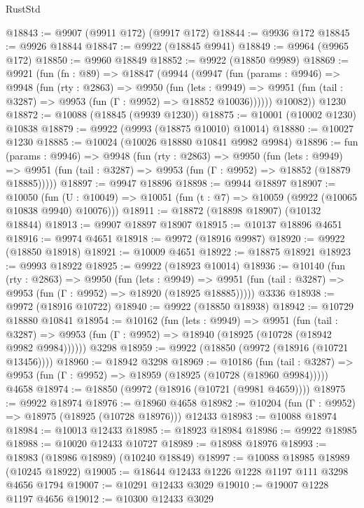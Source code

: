 \begin{lexlean}{RustStd}
\begin{coremodule}
@18843 := @9907 (@9911 @172) (@9917 @172)
@18844 := @9936 @172
@18845 := @9926 @18844
@18847 := @9922 (@18845 @9941)
@18849 := @9964 (@9965 @172)
@18850 := @9960 @18849
@18852 := @9922 (@18850 @9989)
@18869 := @9921
    (fun (fn : @89) =>
    @18847
      (@9944
        (@9947
          (fun (params : @9946) =>
          @9948
            (fun (rty : @2863) =>
            @9950
              (fun (lets : @9949) =>
              @9951 (fun (tail : @3287) => @9953 (fun (Γ : @9952) => @18852 @10036))))))
        @10082))
    @1230
@18872 := @10088 (@18845 (@9939 @1230))
@18875 := @10001 (@10002 @1230) @10838
@18879 := @9922 (@9993 (@18875 @10010) @10014)
@18880 := @10027 @1230
@18885 := @10024 (@10026 @18880 @10841 @9982 @9984)
@18896 := fun (params : @9946) =>
  @9948
    (fun (rty : @2863) =>
    @9950
      (fun (lets : @9949) =>
      @9951 (fun (tail : @3287) => @9953 (fun (Γ : @9952) => @18852 (@18879 @18885)))))
@18897 := @9947 @18896
@18898 := @9944 @18897
@18907 := @10050
    (fun (U : @10049) => @10051 (fun (t : @7) => @10059 (@9922 (@10065 @10838 @9940) @10076)))
@18911 := @18872 (@18898 @18907) (@10132 @18844)
@18913 := @9907 @18897 @18907
@18915 := @10137 @18896 @4651
@18916 := @9974 @4651
@18918 := @9972 (@18916 @9987)
@18920 := @9922 (@18850 @18918)
@18921 := @10009 @4651
@18922 := @18875 @18921
@18923 := @9993 @18922
@18925 := @9922 (@18923 @10014)
@18936 := @10140
    (fun (rty : @2863) =>
    @9950
      (fun (lets : @9949) =>
      @9951 (fun (tail : @3287) => @9953 (fun (Γ : @9952) => @18920 (@18925 @18885)))))
    @3336
@18938 := @9972 (@18916 @10722)
@18940 := @9922 (@18850 @18938)
@18942 := @10729 @18880 @10841
@18954 := @10162
    (fun (lets : @9949) =>
    @9951
      (fun (tail : @3287) =>
      @9953 (fun (Γ : @9952) => @18940 (@18925 (@10728 (@18942 @9982 @9984))))))
    @3298
@18959 := @9922 (@18850 (@9972 (@18916 (@10721 @13456))))
@18960 := @18942 @3298
@18969 := @10186
    (fun (tail : @3287) => @9953 (fun (Γ : @9952) => @18959 (@18925 (@10728 (@18960 @9984)))))
    @4658
@18974 := @18850 (@9972 (@18916 (@10721 (@9981 @4659))))
@18975 := @9922 @18974
@18976 := @18960 @4658
@18982 := @10204 (fun (Γ : @9952) => @18975 (@18925 (@10728 @18976))) @12433
@18983 := @10088 @18974
@18984 := @10013 @12433
@18985 := @18923 @18984
@18986 := @9922 @18985
@18988 := @10020 @12433 @10727
@18989 := @18988 @18976
@18993 := @18983 (@18986 @18989) (@10240 @18849)
@18997 := @10088 @18985 @18989 (@10245 @18922)
@19005 := @18644 @12433 @1226 @1228 @1197 @111 @3298 @4656 @1794
@19007 := @10291 @12433 @3029
@19010 := @19007 @1228 @1197 @4656
@19012 := @10300 @12433 @3029

\end{coremodule}
\end{lexlean}
